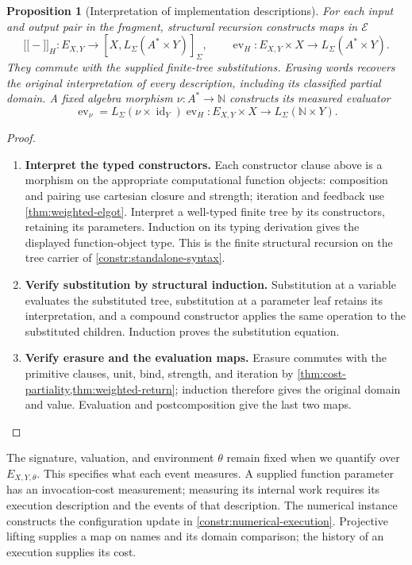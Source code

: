 \documentclass[11pt,a4paper]{article}
\numberwithin{algorithm}{section}
\numberwithin{equation}{section}
\newtheorem{proposition}[proposition]{Proposition}
\theoremstyle{definition}
\theoremstyle{remark}
\theoremstyle{plain}
\newcommand{\E}{\mathcal E}
\newcommand{\N}{\mathbb N}
\newcommand{\LL}{L_{\Sigma}}
\newcommand{\id}{\operatorname{id}}
\newcommand{\llbracket}{\mathopen{[\![}}
\newcommand{\rrbracket}{\mathclose{]\!]}}
\theoremstyle{definition}
\theoremstyle{plain}
\begin{document}
\begin{proposition}[Interpretation of implementation descriptions]
\label{prop:logged-descriptions}
For each input and output pair in the fragment, structural recursion
constructs maps in $\E$
\[
 \llbracket-\rrbracket_H:E_{X,Y}\to[X,\LL(A^*\times Y)]_\Sigma,
 \qquad
 \operatorname{ev}_H:E_{X,Y}\times X\to\LL(A^*\times Y).
\]
They commute with the supplied finite-tree substitutions. Erasing words
recovers the original interpretation of every description, including
its classified partial domain. A fixed algebra morphism $\nu:A^*\to\N$
constructs its measured evaluator
\begin{equation}\label{eq:measured-evaluator}
 \operatorname{ev}_\nu
 =\LL(\nu\times\id_Y)\operatorname{ev}_H:
 E_{X,Y}\times X\to\LL(\N\times Y).
\end{equation}
\end{proposition}
\begin{proof}\leavevmode
\begin{enumerate}[leftmargin=*,align=left]
\item \textbf{Interpret the typed constructors.}
Each constructor clause above is a morphism on the appropriate
computational function objects: composition and pairing use cartesian
closure and strength; iteration and feedback use
\cref{thm:weighted-elgot}. Interpret a well-typed finite tree by its
constructors, retaining its parameters. Induction on its typing
derivation gives the displayed function-object type. This is the finite
structural recursion on the tree carrier of \cref{constr:standalone-syntax}.

\item \textbf{Verify substitution by structural induction.}
Substitution at a variable evaluates the substituted tree, substitution
at a parameter leaf retains its interpretation, and a compound constructor
applies the same operation to the substituted children. Induction proves
the substitution equation.

\item \textbf{Verify erasure and the evaluation maps.}
Erasure commutes with the primitive clauses,
unit, bind, strength, and iteration by
\cref{thm:cost-partiality,thm:weighted-return}; induction therefore gives
the original domain and value. Evaluation and postcomposition give the
last two maps.
\end{enumerate}
\end{proof}

The signature, valuation, and environment $\theta$ remain fixed when
we quantify over $E_{X,Y,\theta}$. This specifies what each event
measures. A supplied function parameter has an invocation-cost
measurement; measuring its internal work requires its execution
description and the events of that description. The numerical instance
constructs the configuration update in
\cref{constr:numerical-execution}. Projective lifting supplies a map on
names and its domain comparison; the history of an execution supplies
its cost.
\end{document}
